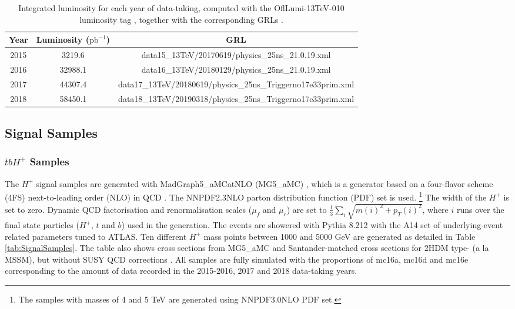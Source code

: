 \begin{table}[H]
  \centering
  \begin{tabular*}{150mm}{@{\extracolsep{\fill}}ccc}
    \hline\hline
    Year & Luminosity ($\text{pb}^{-1}$) & GRL\\
    \hline
    2015 & 3219.6  & data15\_13TeV/20170619/physics\_25ns\_21.0.19.xml\\
    2016 & 32988.1 & data16\_13TeV/20180129/physics\_25ns\_21.0.19.xml\\
    2017 & 44307.4 & data17\_13TeV/20180619/physics\_25ns\_Triggerno17e33prim.xml\\
    2018 & 58450.1 & data18\_13TeV/20190318/physics\_25ns\_Triggerno17e33prim.xml\\
    \hline\hline
  \end{tabular*}
  \caption{Integrated luminosity for each year of data-taking, computed with the OflLumi-13TeV-010 luminosity
  tag \cite{LuminosityForPhysis}, together with the corresponding GRLs \cite{GoodRunListRun2}.}
  \label{tab:GRLForData}
\end{table}


\subsection{Signal Samples}
\label{subsec:SignalSample}

\subsubsection{$\bar{t}bH^{+}$ Samples}
\label{subsec:HpSample}

\setcounter{Num}{2}

The $H^{+}$ signal samples are generated with MadGraph5\_aMCatNLO (MG5\_aMC) \cite{C.Degrande-2015}, which is a generator based on a four-flavor scheme (4FS) next-to-leading order (NLO) in QCD \cite{Alwall:2014hca}. The NNPDF2.3NLO \cite{Ball:2012cx} parton distribution function (PDF) set is used. \footnote{The samples with masses of 4 and 5 TeV are generated using NNPDF3.0NLO \cite{Ball:2014uwa} PDF set.} The width of the $H^{+}$ is set to zero. Dynamic QCD factorisation and renormalisation scales ($\mu_{f}$ and $\mu_{r}$) are set to $\frac{1}{3}\sum_{i}\sqrt{m(i)^{2}+p_{T}(i)^{2}}$, where $i$ runs over the final state particles ($H^{+}$, $t$ and $b$) used in the generation. The events are showered with Pythia 8.212 \cite{Sjostrand:2007gs} with the A14 \cite{ATL-PHYS-PUB-2014-021} set of underlying-event related parameters tuned to ATLAS. Ten different $H^{+}$ mass points between 1000 and 5000 GeV are generated as detailed in Table \ref{tab:SignalSamples}. The table also shows cross sections from MG5\_aMC and Santander-matched cross sections for 2HDM type- (a la MSSM), but without SUSY QCD corrections \cite{C.Degrande-2015, M.Flechl-2015, S.Dittmaier-2011, E.L.Berger-2005}. All samples are fully simulated with the proportions of mc16a, mc16d and mc16e corresponding to the amount of data recorded in the 2015-2016, 2017 and 2018 data-taking years.

